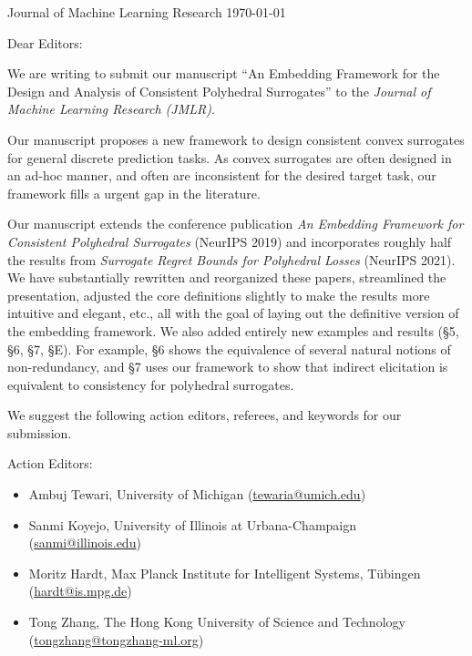 


Journal of Machine Learning Research \hfill \today

\bigskip

Dear Editors:

We are writing to submit our manuscript ``An Embedding Framework for the Design and Analysis of Consistent Polyhedral Surrogates'' to the \emph{Journal of Machine Learning Research (JMLR)}.

Our manuscript proposes a new framework to design consistent convex surrogates for general discrete prediction tasks.
As convex surrogates are often designed in an ad-hoc manner, and often are inconsistent for the desired target task, our framework fills a urgent gap in the literature.

Our manuscript extends the conference publication \emph{An Embedding Framework for Consistent Polyhedral Surrogates} (NeurIPS 2019) and incorporates roughly half the results from \emph{Surrogate Regret Bounds for Polyhedral Losses} (NeurIPS 2021).
We have substantially rewritten and reorganized these papers, streamlined the presentation, adjusted the core definitions slightly to make the results more intuitive and elegant, etc., all with the goal of laying out the definitive version of the embedding framework.
We also added entirely new examples and results (\S 5, \S 6, \S 7, \S E).
For example, \S 6 shows the equivalence of several natural notions of non-redundancy, and \S 7 uses our framework to show that indirect elicitation is equivalent to consistency for polyhedral surrogates.

We suggest the following action editors, referees, and keywords for our submission.

Action Editors:
\begin{itemize}
    \item Ambuj Tewari, University of Michigan (\url{tewaria@umich.edu})
    \item Sanmi Koyejo, University of Illinois at Urbana-Champaign (\url{sanmi@illinois.edu})
    \item Moritz Hardt, Max Planck Institute for Intelligent Systems, T\"ubingen (\url{hardt@is.mpg.de})
    \item Tong Zhang,  The Hong Kong University of Science and Technology (\url{tongzhang@tongzhang-ml.org})
\end{itemize}

